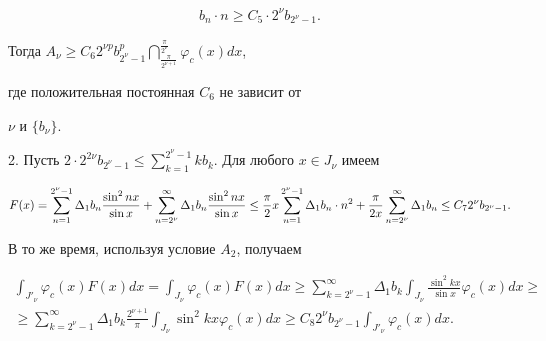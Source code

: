 \begin{pf}
\begin{multline*}
b_n\cdot n\geq C_5\cdot 2^\nu b_{2^\nu -1}.


\end{multline*}


Тогда $A_\nu \geq C_6 2^{\nu p} b_{2^\nu-1}^{p}


\dint_{\frac{\pi}{2^{\nu+1}}}^{\frac{\pi}{2^\nu}}


\varphi_c(x) dx$,


где положительная постоянная $C_6$ не зависит от


$\nu $ и $\{b_{\nu} \}$.





2. Пусть $2\cdot 2^{2\nu } b_{2^\nu -1} \leq \sum\limits_{k=1}^{2^\nu-1}


k b_k$. Для любого $x\in J_\nu $ имеем


$$


F(x)= \sum\limits_{n=1}^{2^\nu -1} \Delta _1 b_n \frac{\sin^2 nx}{\sin x} +


\sum\limits_{n=2^\nu}^{\infty}


\Delta _1 b_n \frac{\sin^2 nx}{\sin x} \leq\\


\frac{\pi}{2} x \sum\limits_{n=1}^{2^\nu -1} 


\Delta _1 b_n\cdot n^2 +\frac{\pi}{2x}


\sum\limits_{n=2^\nu}^{\infty} \Delta _1 b_n \leq


C_7 2^\nu b_{2^\nu -1}.


$$





В то же время, используя условие $A_2$, получаем


\begin{multline*}


\int_{J'_\nu} \varphi_c(x) F(x) dx =


\int_{J_\nu} \varphi_c(x) F(x) dx \geq 


\sum\limits_{k=2^\nu-1}^{\infty} \Delta _1 b_k 


\int_{J_\nu} \frac{\sin^2 kx}{\sin x}


\varphi_c(x) dx \geq \\


%


\ge\sum\limits_{k=2^\nu-1}^{\infty} \Delta _1 b_k \frac{2^{\nu+1}}{\pi}


\int_{J_\nu} \sin^2 kx \varphi_c(x) dx\geq


C_8 2^\nu b_{2^\nu-1} \int_{J'_\nu} \varphi_c(x) dx.



\end{multline*}
\end{pf}
